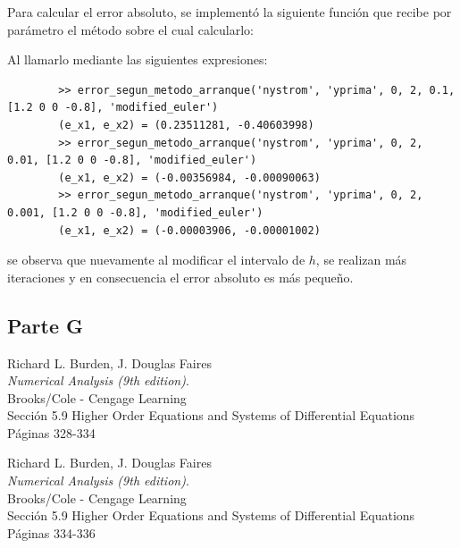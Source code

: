 \documentclass[titlepage,a4paper]{article}
\begin{document}
	Para calcular el error absoluto, se implementó la siguiente función que recibe por parámetro el método sobre el cual calcularlo:
	

	Al llamarlo mediante las siguientes expresiones:

	\begin{lstlisting}
		>> error_segun_metodo_arranque('nystrom', 'yprima', 0, 2, 0.1, [1.2 0 0 -0.8], 'modified_euler')
		(e_x1, e_x2) = (0.23511281, -0.40603998)
		>> error_segun_metodo_arranque('nystrom', 'yprima', 0, 2, 0.01, [1.2 0 0 -0.8], 'modified_euler')
		(e_x1, e_x2) = (-0.00356984, -0.00090063)
		>> error_segun_metodo_arranque('nystrom', 'yprima', 0, 2, 0.001, [1.2 0 0 -0.8], 'modified_euler')
		(e_x1, e_x2) = (-0.00003906, -0.00001002)
	\end{lstlisting}

	se observa que nuevamente al modificar el intervalo de $ h $, se realizan más iteraciones y en consecuencia el error absoluto es más pequeño.

	\subsection{Parte G}\label{sec:parteG}

\begin{thebibliography}{9} 
		Richard L. Burden, J. Douglas Faires\\
		\textit{Numerical Analysis (9th edition)}. \\
		Brooks/Cole - Cengage Learning\\
		Sección 5.9 Higher Order Equations and Systems of Differential Equations\\
		Páginas 328-334

		Richard L. Burden, J. Douglas Faires\\
		\textit{Numerical Analysis (9th edition)}.\\ 
		Brooks/Cole - Cengage Learning\\
		Sección 5.9 Higher Order Equations and Systems of Differential Equations\\
		Páginas 334-336
	 
\end{thebibliography}
\end{document}
